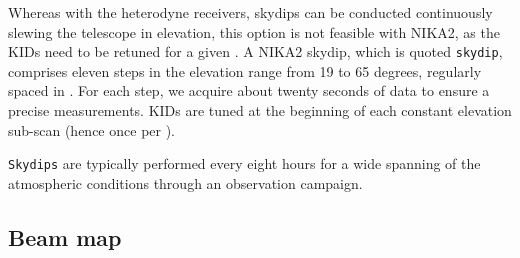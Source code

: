 Whereas with the heterodyne receivers, skydips can be
conducted continuously slewing the telescope in elevation, this
option is not feasible with NIKA2, as the KIDs need to be retuned
for a given \airmass. A NIKA2 skydip, which is quoted {\tt skydip},
comprises eleven steps in the elevation range from 19 to 65 degrees,
regularly spaced in \airmass. For each step, we acquire about twenty
seconds of data to ensure a precise measurements. KIDs are tuned at
the beginning of each constant elevation sub-scan (hence once per
\airmass).

{\tt Skydips} {\lp are typically performed every eight hours for a wide spanning
of the atmospheric conditions through an observation campaign.} 


%



\subsection{Beam map}
\label{se:beammaps}

